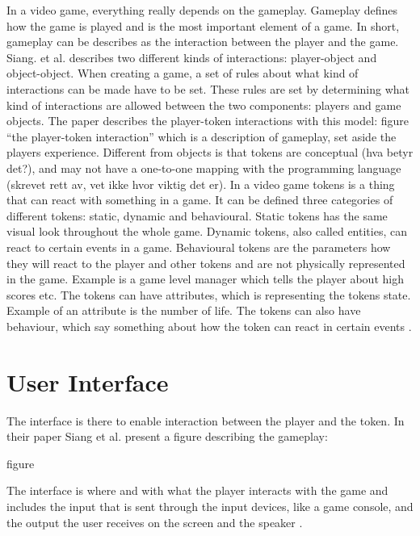 In a video game, everything really depends on the gameplay. Gameplay defines how the game is played and is the most important element of a game. In short, gameplay can be describes as the interaction between the player and the game. Siang. et al. describes two different kinds of interactions: player-object and object-object. When creating a game, a set of rules about what kind of interactions can be made have to be set. These rules are set by determining what kind of interactions are allowed between the two components: players and game objects. The paper describes the player-token interactions with this model:
figure “the player-token interaction”
which is a description of gameplay, set aside the players experience. 
Different from objects is that tokens are conceptual (hva betyr det?), and may not have a one-to-one mapping with the programming language (skrevet rett av, vet ikke hvor viktig det er).
In a video game tokens is a thing that can react with something in a game. It can be defined three categories of different tokens: static, dynamic and behavioural. Static tokens has the same visual look throughout the whole game. Dynamic tokens, also called entities, can react to certain events in a game. Behavioural tokens are the parameters how they will react to the player and other tokens and are not physically represented in the game. Example is a game level manager which tells the player about high scores etc. The tokens can have attributes, which is representing the tokens state. Example of an attribute is the number of life. The tokens can also have behaviour, which say something about how the token can react in certain events \cite{umlapproach}.

\section{User Interface}
The interface is there to enable interaction between the player and the token. In their paper Siang et al. present a figure describing the gameplay:

figure

The interface is where and with what the player interacts with the game and includes the input that is sent through the input devices, like a game console, and the output the user receives on the screen and the speaker \cite{umlapproach}.
